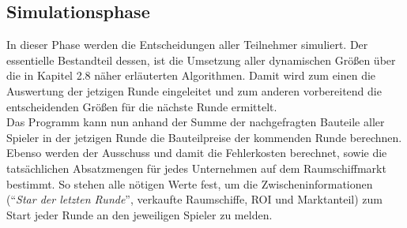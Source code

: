 \subsection{Simulationsphase}
\label{sec:spielwelt-regeln-simulationsphase}

In dieser Phase werden die Entscheidungen aller Teilnehmer  simuliert. Der essentielle Bestandteil dessen, ist die Umsetzung aller dynamischen Größen über die in Kapitel 2.8 näher erläuterten Algorithmen. Damit wird zum einen die Auswertung der jetzigen Runde eingeleitet und zum anderen vorbereitend die entscheidenden Größen für die nächste Runde ermittelt. 
\\
Das Programm kann nun anhand der Summe der nachgefragten Bauteile aller Spieler in der jetzigen Runde die Bauteilpreise der kommenden Runde berechnen. Ebenso werden der Ausschuss und damit die Fehlerkosten berechnet, sowie die tatsächlichen Absatzmengen für jedes Unternehmen auf dem Raumschiffmarkt bestimmt. So stehen alle nötigen Werte fest, um die Zwischeninformationen ("`\textit{Star der letzten Runde}"', verkaufte Raumschiffe, ROI und Marktanteil) zum Start jeder Runde an den jeweiligen Spieler zu melden.




